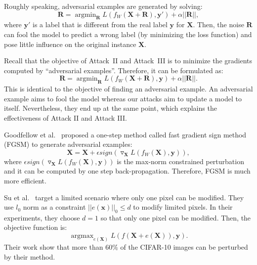 \documentclass[conference]{IEEEtran}
\newcommand{\XX}{\mathbf{X}\xspace}
\begin{document}
Roughly speaking, adversarial examples are generated by solving:
$$\mathbf{R}=\mathop{\arg\min}_{\mathbf{R}}L(f_{W}(\mathbf{X}+\mathbf{R}),\mathbf{y}')+\alpha||\mathbf{R}||,$$
where $\mathbf{y}'$ is a {label\EndAccSupp{}} that is different from the real {label\EndAccSupp{}} $\mathbf{y}$ for $\mathbf{X}$.
Then, the noise $\mathbf{R}$ can fool the model to predict a wrong {label\EndAccSupp{}} (by minimizing the loss function) and pose little influence on the original instance $\mathbf{X}$.





Recall that the objective of Attack~II and Attack~III is to minimize the gradients computed by ``adversarial examples''. 
Therefore, it can be {formulated\EndAccSupp{}} as: $$\mathbf{R}=\mathop{\arg\min}_{\mathbf{R}}L(f_{W}(\mathbf{X}+\mathbf{R}),\mathbf{y})+\alpha||\mathbf{R}||.$$
This is identical to the objective of finding an adversarial example.
An adversarial example aims to fool the model {whereas\EndAccSupp{}} our attacks aim to update a model to itself.
Nevertheless, they end up at the same point, which explains the {effectiveness\EndAccSupp{}} of Attack II and Attack III.







{Goodfellow\EndAccSupp{}} {et\EndAccSupp{}} al.~\cite{goodfellow2014explaining} proposed a one-step {method\EndAccSupp{}} called fast gradient sign {method\EndAccSupp{}} (FGSM) to generate adversarial examples:
$$\XX=\XX + \epsilon sign(\triangledown_{\XX} L(f_W(\mathbf{X}),\mathbf{y})),$$
where $\epsilon sign(\triangledown_{\XX} L(f_W(\mathbf{X}),\mathbf{y}))$ is the max-norm constrained perturbation and it can be computed by one step back-propagation.
Therefore, FGSM is much more efficient. 





Su {et\EndAccSupp{}} al.~\cite{su2019one} {target\EndAccSupp{}} a limited {scenario\EndAccSupp{}} where only one pixel can be modified. They use $l_0$ norm as a constraint $||e(\mathbf{x})||_0\leq d$ to modify limited pixels. 
In their experiments, they choose $d=1$ so that only one pixel can be modified. 
Then, the objective function is: $$\mathop{\arg\max}_{e(\mathbf{\XX})}L(f(\mathbf{\XX}+e(\mathbf{\XX})),\mathbf{y}).$$ 
Their work show that more than 60$\%$ of the CIFAR-10 {images\EndAccSupp{}} can be perturbed by their method.
\end{document}
